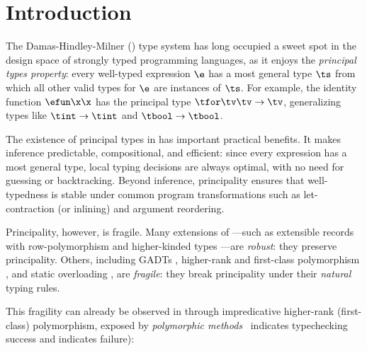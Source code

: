 \documentclass[acmsmall,screen,nonacm%
\Anonymous{,anonymous}{}%
\Final{}{,review}%
]{acmart}
\newcommand{\BBpolyml}{Garrigue-Remy/poly-ml} %
\providecommand{\DIFadd}[1]{\protect\cbstart{\protect\color{blue}#1}\protect\cbend} %
\providecommand{\DIFdel}[1]{\protect\cbdelete{\protect\color{red}#1}\protect\cbdelete} %
\providecommand{\DIFaddbegin}{} %
\providecommand{\DIFaddend}{} %
\providecommand{\DIFdelbegin}{} %
\providecommand{\DIFdelend}{} %
\begin{document}
\section{Introduction}
\label{sec/introduction}


The Damas-Hindley-Milner (\ML) \citep*{Damas-Milner/W@popl82,
hindley1969principal} type system has long occupied a sweet spot in the design
space of strongly typed programming languages, as it enjoys the \emph{principal
types property}: every well-typed expression $\e$ has a most general type $\ts$
from which all other valid types for $\e$ are instances of $\ts$. For example,
the identity function $\efun \x \x$ has the principal type $\tfor \tv \tv \to
\tv$, generalizing types like $\tint \to \tint$ and $\tbool \to \tbool$.


The existence of principal types in \ML has important practical benefits. It
makes inference predictable, compositional, and efficient: since every
expression has a most general type, local typing decisions are always optimal,
with no need for guessing or backtracking. Beyond inference, principality
ensures that well-typedness is stable under common program transformations such
as let-contraction (or inlining) and argument reordering.


Principality, however, is fragile. Many extensions of \ML---such as extensible
records with row-polymorphism \citep*{Remy/popl89, conf/popl/RemyV97,
conf/lics/Wand89, journals/toplas/Ohori95, garrigue1998programming} and
higher-kinded types \citep*{journals/jfp/Jones95}---are \emph{robust}: they
preserve principality. Others, including GADTs
\citep*{conf/icfp/SchrijversJSV09, conf/aplas/GarrigueR13}, higher-rank and
first-class polymorphism \DIFdelbegin %
\DIFdelend \DIFaddbegin \citep*{conf/popl/OderskyL96,
\BBpolyml, journals/pacmpl/SerranoHJV20}\DIFaddend , and static overloading
\citep*{Chargueraud-Bodin-Dunfield-Riboulet/jfla2025}, are \emph{fragile}: they
break principality under their \emph{natural} typing rules.


This fragility can already be observed in \OCaml through impredicative
higher-rank (\ie first-class) polymorphism, exposed by \emph{polymorphic
methods}~\DIFdelbegin \DIFdel{\citep{Garrigue-Remy/poly-ml} (}%
\DIFdelend \DIFaddbegin \DIFadd{\citep{\BBpolyml} (} \DIFaddend indicates
typechecking success and \DIFdelbegin %
\DIFdelend \DIFaddbegin {} \DIFaddend indicates
failure):
\DIFaddbegin 
\end{document}
